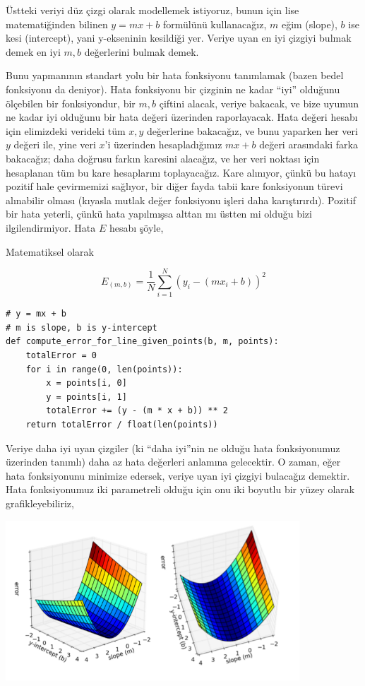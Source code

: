 \documentclass[12pt,fleqn]{article}\usepackage{../../common}
\begin{document}
Üstteki veriyi düz çizgi olarak modellemek istiyoruz, bunun için lise
matematiğinden bilinen $y = mx + b$ formülünü kullanacağız, $m$ eğim (slope),
$b$ ise kesi (intercept), yani y-ekseninin kesildiği yer. Veriye uyan en iyi
çizgiyi bulmak demek en iyi $m,b$ değerlerini bulmak demek.

Bunu yapmanının standart yolu bir hata fonksiyonu tanımlamak (bazen bedel
fonksiyonu da deniyor). Hata fonksiyonu bir çizginin ne kadar ``iyi'' olduğunu
ölçebilen bir fonksiyondur, bir $m,b$ çiftini alacak, veriye bakacak, ve bize
uyumun ne kadar iyi olduğunu bir hata değeri üzerinden raporlayacak. Hata değeri
hesabı için elimizdeki verideki tüm $x,y$ değerlerine bakacağız, ve bunu
yaparken her veri $y$ değeri ile, yine veri $x$'i üzerinden hesapladığımız
$mx+b$ değeri arasındaki farka bakacağız; daha doğrusu farkın karesini alacağız,
ve her veri noktası için hesaplanan tüm bu kare hesaplarını toplayacağız. Kare
alınıyor, çünkü bu hatayı pozitif hale çevirmemizi sağlıyor, bir diğer fayda
tabii kare fonksiyonun türevi alınabilir olması (kıyasla mutlak değer fonksiyonu
işleri daha karıştırırdı). Pozitif bir hata yeterli, çünkü hata yapılmışsa
alttan mı üstten mi olduğu bizi ilgilendirmiyor. Hata $E$ hesabı şöyle,

Matematiksel olarak

$$ E_{(m,b)} = \frac{1}{N} \sum_{i=1}^{N} (y_i - (mx_i + b))^2$$

\begin{verbatim}
# y = mx + b
# m is slope, b is y-intercept
def compute_error_for_line_given_points(b, m, points):
    totalError = 0
    for i in range(0, len(points)):
        x = points[i, 0]
        y = points[i, 1]
        totalError += (y - (m * x + b)) ** 2
    return totalError / float(len(points))
\end{verbatim}

Veriye daha iyi uyan çizgiler (ki ``daha iyi''nin ne olduğu hata fonksiyonumuz
üzerinden tanımlı) daha az hata değerleri anlamına gelecektir. O zaman, eğer
hata fonksiyonunu minimize edersek, veriye uyan iyi çizgiyi bulacağız
demektir. Hata fonksiyonumuz iki parametreli olduğu için onu iki boyutlu bir
yüzey olarak grafikleyebiliriz,

\includegraphics[height=6cm]{vision_90fitting_06.png}
\end{document}
